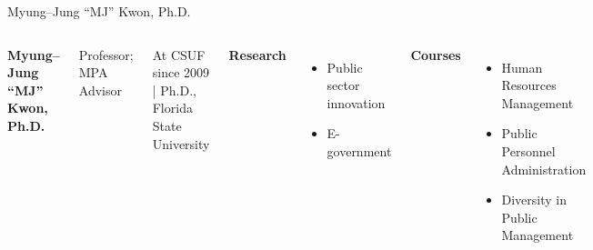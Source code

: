 \documentclass[10pt]{beamer}
\newlength{\imageheight}
\begin{document}
\begin{frame}{Myung--Jung ``MJ'' Kwon, Ph.D.}
\begin{columns}[T,onlytextwidth]
    \raggedright
  {\large\bfseries Myung--Jung ``MJ'' Kwon, Ph.D.}\par
    {Professor; MPA Advisor}\par
    {\footnotesize At CSUF since 2009 \quad | \quad Ph.D., Florida State University}\par\vspace{0.4em}

    \textbf{Research}
    \begin{itemize}
      \item Public sector innovation
      \item E-government
    \end{itemize}

    \textbf{Courses}
    \begin{itemize}
      \item Human Resources Management
      \item Public Personnel Administration
      \item Diversity in Public Management
    \end{itemize}

    \vspace*{0.25cm}
    \includegraphics[height=\imageheight]{images/kwon.jpg}
\end{columns}
\end{frame}
\end{document}
